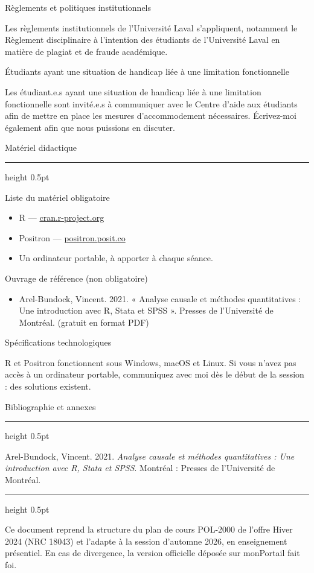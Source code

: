 \documentclass[10pt]{article}
\newcommand{\ulsection}[1]{%
  \needspace{4\baselineskip}%
  \vspace{14pt}%
  {\headfont\fontsize{17}{20}\selectfont #1}\par
  \vspace{3pt}%
  {\color{ulrule}\hrule height 0.5pt}%
  \vspace{6pt}%
}
\newcommand{\ulsub}[1]{%
  \needspace{3\baselineskip}%
  \vspace{10pt}%
  {\headfont\fontsize{12.5}{15}\selectfont #1}\par
  \vspace{2pt}%
}
\begin{document}
\ulsub{Règlements et politiques institutionnels}
{\fontsize{9.5}{12.5}\selectfont
Les règlements institutionnels de l'Université Laval s'appliquent, notamment le Règlement disciplinaire à l'intention des étudiants de l'Université Laval en matière de plagiat et de fraude académique.\par}

\ulsub{Étudiants ayant une situation de handicap liée à une limitation fonctionnelle}
{\fontsize{9.5}{12.5}\selectfont
Les étudiant.e.s ayant une situation de handicap liée à une limitation fonctionnelle sont invité.e.s à communiquer avec le Centre d'aide aux étudiants afin de mettre en place les mesures d'accommodement nécessaires. Écrivez-moi également afin que nous puissions en discuter.\par}

\newpage

\ulsection{Matériel didactique}

\ulsub{Liste du matériel obligatoire}
{\fontsize{9.5}{12.5}\selectfont
\begin{itemize}
  \item R --- \href{https://cran.r-project.org}{cran.r-project.org}
  \item Positron --- \href{https://positron.posit.co/download.html}{positron.posit.co}
  \item Un ordinateur portable, à apporter à chaque séance.
\end{itemize}\par}

\ulsub{Ouvrage de référence (non obligatoire)}
{\fontsize{9.5}{12.5}\selectfont
\begin{itemize}
  \item Arel-Bundock, Vincent. 2021. « Analyse causale et méthodes quantitatives : Une introduction avec R, Stata et SPSS ». Presses de l'Université de Montréal. (gratuit en format PDF)
\end{itemize}\par}

\ulsub{Spécifications technologiques}
{\fontsize{9.5}{12.5}\selectfont
R et Positron fonctionnent sous Windows, macOS et Linux. Si vous n'avez pas accès à un ordinateur portable, communiquez avec moi dès le début de la session : des solutions existent.\par}

\ulsection{Bibliographie et annexes}
{\fontsize{9.5}{12.5}\selectfont
Arel-Bundock, Vincent. 2021. \emph{Analyse causale et méthodes quantitatives : Une introduction avec R, Stata et SPSS}. Montréal : Presses de l'Université de Montréal.\par}

\vspace{18pt}
{\color{ulrule}\hrule height 0.5pt}
\vspace{6pt}
{\fontsize{8.5}{11}\selectfont\color{ulsub}
Ce document reprend la structure du plan de cours POL-2000 de l'offre Hiver 2024 (NRC 18043) et l'adapte à la session d'automne 2026, en enseignement présentiel. En cas de divergence, la version officielle déposée sur monPortail fait foi.\par}
\end{document}

